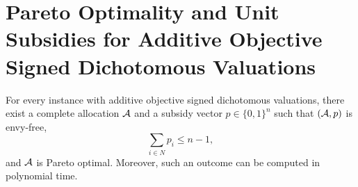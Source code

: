 \section{Pareto Optimality and Unit Subsidies for Additive Objective Signed Dichotomous Valuations}
\label{app:additive-objective-po}
\begin{proposition}
\label{prop:additive-objective-po}
For every instance with additive objective signed dichotomous valuations, there exist a complete allocation $\mathcal{A}$ and a subsidy vector $p\in\{0,1\}^n$ such that $(\mathcal{A},p)$ is envy-free,
\[
\sum_{i\in N}p_i\leq n-1,
\]
and $\mathcal{A}$ is Pareto optimal. Moreover, such an outcome can be computed in polynomial time.
\end{proposition}


